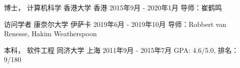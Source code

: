 

\begin{cventries}


\cventry
{博士， 计算机科学} %
{香港大学} %
{香港} %
{2015年9月 - 2020年1月} %
{ %
导师：崔鹤鸣
}


\cventry
{访问学者} %
{康奈尔大学} %
{伊萨卡} %
{2019年6月 - 2019年10月} %
{ %
导师：Robbert van Renesse, Hakim Weatherspoon
}


\cventry
{本科， 软件工程} %
{同济大学} %
{上海} %
{2011年9月 - 2015年7月} %
{ %
GPA: 4.6/5.0, 排名：9/180
}

\end{cventries}